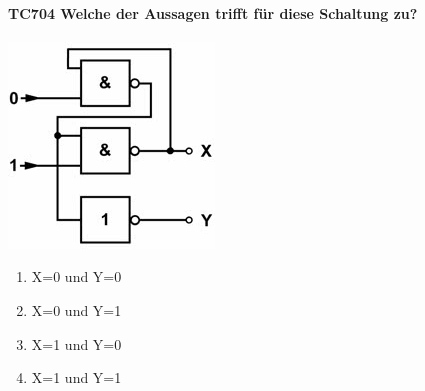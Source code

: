 \documentclass[8pt]{article}
\begin{document}
\begin{enumerate}
\begin{enumerate}[nolistsep,label=\Alph*]
{\begin{enumerate}[nolistsep,label=\Alph*]
\paragraph*{TC704 Welche der Aussagen trifft für diese Schaltung zu?}
\begin{center}
	\begin{minipage}{\linewidth}
		\centering
		\includegraphics[scale=1.0]{pics/tc704_a.jpg}
	\end{minipage}
\end{center}
\begin{enumerate}[nolistsep,label=\Alph*]
\item X=0 und Y=0
\item X=0 und Y=1
\item X=1 und Y=0
\item X=1 und Y=1
\end{enumerate}


\end{enumerate}}
\end{enumerate}
\end{enumerate}
\end{document}
